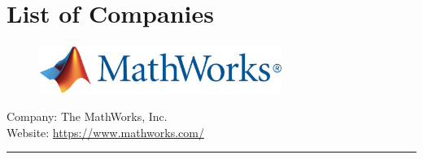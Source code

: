 \chapter{List of Companies}
\label{AppendixListOfCompanies}


\begin{figure}[h!]
\includegraphics[height=1.6cm]{Pictures/AppMathworksLogo}
\end{figure}
\vspace{3mm}
Company: The MathWorks, Inc.\\
Website: \url{https://www.mathworks.com/}
\vspace{5mm}
\hrule
\vspace{10mm}


